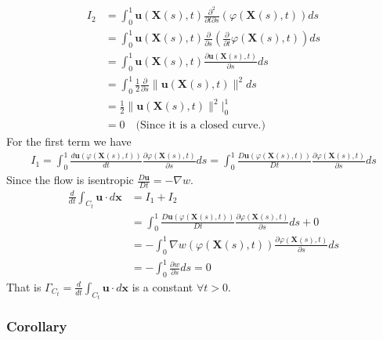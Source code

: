 \begin{equation}
\begin{aligned}
I_2
&= \int_{0}^{1} \textbf{u}(\textbf{X}(s),t) \frac{\partial^2}{\partial t\partial s}\left(\varphi(\textbf{X}(s),t)\right) ds\\
&= \int_{0}^{1} \textbf{u}(\textbf{X}(s),t) \frac{\partial}{\partial s }\left(\frac{\partial}{\partial t}\varphi(\textbf{X}(s),t)\right) ds\\
&= \int_{0}^{1} \textbf{u}(\textbf{X}(s),t) \frac{\partial \textbf{u}(\textbf{X}(s),t)}{\partial s } ds\\
&= \int_{0}^{1} \frac{1}{2}\frac{\partial}{\partial s}\lVert\textbf{u}(\textbf{X}(s),t)\rVert^2ds\\
&=  \frac{1}{2}\lVert\textbf{u}(\textbf{X}(s),t)\rVert^2\bigg|_{0}^{1}\\
&= 0\quad\text{(Since it is a closed curve.)}
\end{aligned}
\end{equation}
For the first term we have
\begin{equation}
\begin{aligned}
I_1 = \int_{0}^{1} \frac{d\textbf{u}\left(\varphi(\textbf{X}(s),t)\right)}{dt} \frac{\partial \varphi(\textbf{X}(s),t)}{\partial s}ds
= \int_{0}^{1} \frac{D\textbf{u}\left(\varphi(\textbf{X}(s),t)\right)}{Dt} \frac{\partial \varphi(\textbf{X}(s),t)}{\partial s}ds
\end{aligned}
\end{equation}
Since the flow is isentropic $\displaystyle \frac{D\textbf{u}}{Dt} = -\nabla w$.
\begin{equation}
\begin{aligned}
\frac{d}{dt} \int_{C_{t}} \textbf{u}\cdot d\textbf{x} &= I_1 + I_2 \\
&= \int_{0}^{1} \frac{D\textbf{u}\left(\varphi(\textbf{X}(s),t)\right)}{Dt} \frac{\partial \varphi(\textbf{X}(s),t)}{\partial s}ds+0\\
&= - \int_{0}^{1} \nabla w \left(\varphi(\textbf{X}(s),t)\right) \frac{\partial \varphi(\textbf{X}(s),t)}{\partial s}ds\\
&= - \int_{0}^{1} \frac{\partial w}{\partial s} ds = 0
\end{aligned}
\end{equation}
That is $\displaystyle \Gamma_{C_t} = \frac{d}{dt} \int_{C_{t}} \textbf{u}\cdot d\textbf{x}$ is a constant $\forall t>0$.

\subsubsection{Corollary} %

